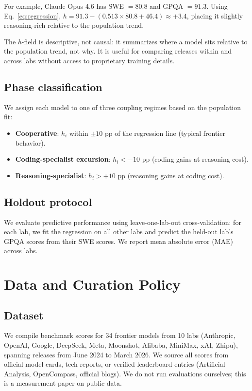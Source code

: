 \documentclass{article}
\begin{document}
For example, Claude Opus 4.6 has SWE $= 80.8$ and GPQA $= 91.3$.
Using Eq.~\ref{eq:regression}, $h = 91.3 - (0.513 \times 80.8 + 46.4) \approx +3.4$,
placing it slightly reasoning-rich relative to the population trend.

The $h$-field is descriptive, not causal: it summarizes where a model sits relative to
the population trend, not why. It is useful for comparing releases within and across labs
without access to proprietary training details.

\subsection{Phase classification}

We assign each model to one of three coupling regimes based on the population fit:
\begin{itemize}[nosep,leftmargin=*]
  \item \textbf{Cooperative}: $h_i$ within $\pm 10$ pp of the regression line
        (typical frontier behavior).
  \item \textbf{Coding-specialist excursion}: $h_i < -10$ pp (coding gains at reasoning cost).
  \item \textbf{Reasoning-specialist}: $h_i > +10$ pp (reasoning gains at coding cost).
\end{itemize}

\subsection{Holdout protocol}

We evaluate predictive performance using leave-one-lab-out cross-validation:
for each lab, we fit the regression on all other labs and predict the held-out lab's
GPQA scores from their SWE scores. We report mean absolute error (MAE) across labs.

\section{Data and Curation Policy}
\label{sec:data}

\subsection{Dataset}

We compile benchmark scores for 34 frontier models from 10 labs
(Anthropic, OpenAI, Google, DeepSeek, Meta, Moonshot, Alibaba, MiniMax, xAI, Zhipu),
spanning releases from June 2024 to March 2026.
We source all scores from official model cards, tech reports, or verified leaderboard
entries (Artificial Analysis, OpenCompass, official blogs).
We do not run evaluations ourselves; this is a measurement paper on public data.
\end{document}
